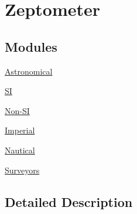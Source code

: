 \hypertarget{group___e_g_x_math-_conversions-_length_conversions-_s_i-_zeptometer}{}\section{Zeptometer}
\label{group___e_g_x_math-_conversions-_length_conversions-_s_i-_zeptometer}
\subsection*{Modules}
\begin{DoxyCompactItemize}
\item 
\mbox{\hyperlink{group___e_g_x_math-_conversions-_length_conversions-_s_i-_zeptometer-_astronomical}{Astronomical}}
\item 
\mbox{\hyperlink{group___e_g_x_math-_conversions-_length_conversions-_s_i-_zeptometer-_s_i}{SI}}
\item 
\mbox{\hyperlink{group___e_g_x_math-_conversions-_length_conversions-_s_i-_zeptometer-_non-_s_i}{Non-\/\+SI}}
\item 
\mbox{\hyperlink{group___e_g_x_math-_conversions-_length_conversions-_s_i-_zeptometer-_imperial}{Imperial}}
\item 
\mbox{\hyperlink{group___e_g_x_math-_conversions-_length_conversions-_s_i-_zeptometer-_nautical}{Nautical}}
\item 
\mbox{\hyperlink{group___e_g_x_math-_conversions-_length_conversions-_s_i-_zeptometer-_surveyors}{Surveyors}}
\end{DoxyCompactItemize}


\subsection{Detailed Description}

